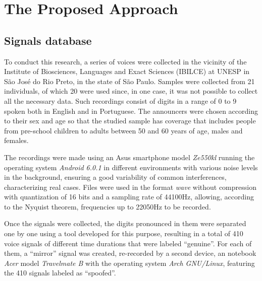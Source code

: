 \section{The Proposed Approach}
	\label{sec:propApproach}
	\subsection{Signals database}
		\par To conduct this research, a series of voices were collected in the vicinity of the Institute of Biosciences, Languages and Exact Sciences (IBILCE) at UNESP in São José do Rio Preto, in the state of São Paulo. Samples were collected from 21 individuals, of which 20 were used since, in one case, it was not possible to collect all the necessary data. Such recordings consist of digits in a range of 0 to 9 spoken both in English and in Portuguese. The announcers were chosen according to their sex and age so that the studied sample has coverage that includes people from pre-school children to adults between 50 and 60 years of age, males and females.
		
		\par The recordings were made using an Asus smartphone model \textit{Ze550kl} running the operating system \textit{Android 6.0.1} in different environments with various noise levels in the background, ensuring a good variability of common interferences, characterizing real cases. Files were used in the format \textit{wave} without compression with quantization of 16 bits and a sampling rate of 44100Hz, allowing, according to the Nyquist theorem, frequencies up to 22050Hz to be recorded.
		
		\par Once the signals were collected, the digits pronounced in them were separated one by one using a tool developed for this purpose, resulting in a total of 410 voice signals of different time durations that were labeled ``genuine''. For each of them, a ``mirror'' signal was created, re-recorded by a second device, an notebook \textit{Acer} model \textit{Travelmate B} with the operating system \textit{Arch GNU/Linux}, featuring the 410 signals labeled as  ``spoofed''.
		
